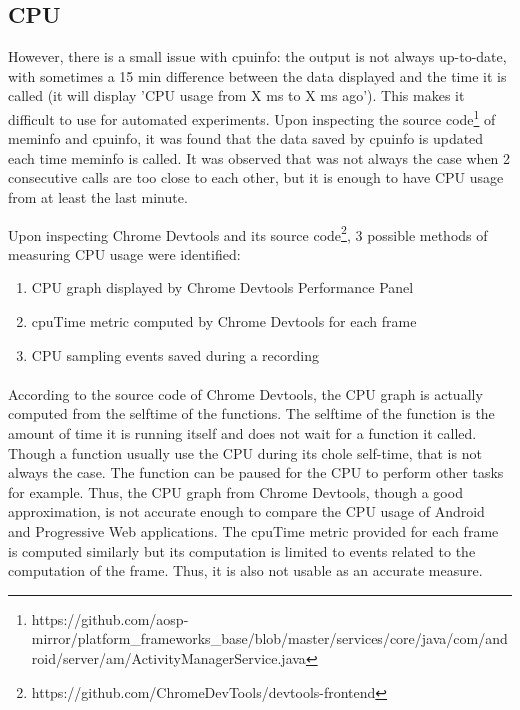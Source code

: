 \fi
\subsection{CPU}


However, there is a small issue with cpuinfo: the output is not always up-to-date, with sometimes a 15 min difference between the data displayed and the time it is called (it will display 'CPU usage from X ms to X ms ago'). This makes it difficult to use for automated experiments. Upon inspecting the source code\footnote{https://github.com/aosp-mirror/platform\_frameworks\_base/blob/master/services/core/java/com/android/server/am/ActivityManagerService.java} of meminfo and cpuinfo, it was found that the data saved by cpuinfo is updated each time meminfo is called. It was observed that was not always the case when 2 consecutive calls are too close to each other, but it is enough to have CPU usage from at least the last minute.

Upon inspecting Chrome Devtools and its source code\footnote{https://github.com/ChromeDevTools/devtools-frontend}, 3 possible methods of measuring CPU usage were identified:
\begin{enumerate}
    \item CPU graph displayed by Chrome Devtools Performance Panel
    \item cpuTime metric computed by Chrome Devtools for each frame
    \item CPU sampling events saved during a recording
\end{enumerate}

\paragraph{}
According to the source code of Chrome Devtools, the CPU graph is actually computed from the selftime of the functions. The selftime of the function is the amount of time it is running itself and does not wait for a function it called. Though a function usually use the CPU during its chole self-time, that is not always the case. The function can be paused for the CPU to perform other tasks for example. Thus, the CPU graph from Chrome Devtools, though a good approximation, is not accurate enough to compare the CPU usage of Android and Progressive Web applications. \newline
The cpuTime metric provided for each frame is computed similarly but its computation is limited to events related to the computation of the frame. Thus, it is also not usable as an accurate measure.

